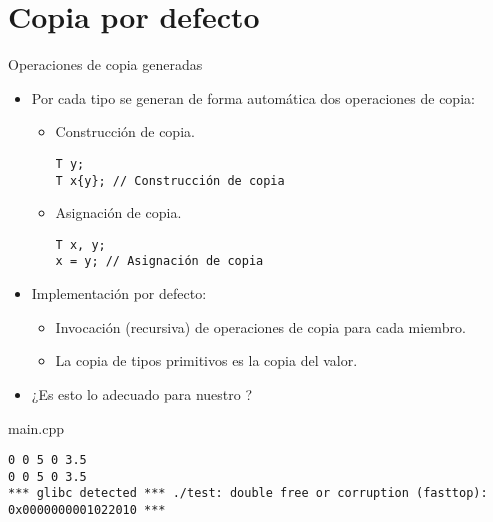 \section{Copia por defecto}

\begin{frame}[fragile]{Operaciones de copia generadas}
\begin{itemize}
  \item Por cada tipo se generan de forma automática dos operaciones de copia:
    \begin{itemize}
      \item Construcción de copia.
\begin{lstlisting}
T y;
T x{y}; // Construcción de copia
\end{lstlisting}
      \item Asignación de copia.
\begin{lstlisting}
T x, y;
x = y; // Asignación de copia
\end{lstlisting}
    \end{itemize}
  \item Implementación por defecto:
    \begin{itemize}
      \item Invocación (recursiva) de operaciones de copia para cada miembro.
      \item La copia de tipos primitivos es la copia del valor.
    \end{itemize}
  \item ¿Es esto lo adecuado para nuestro ?
\end{itemize}
\end{frame}

\begin{frame}[fragile]
\begin{block}{main.cpp}

\end{block}
\begin{lstlisting}[style=terminal]
0 0 5 0 3.5 
0 0 5 0 3.5 
*** glibc detected *** ./test: double free or corruption (fasttop): 
0x0000000001022010 ***
\end{lstlisting}
\end{frame}

